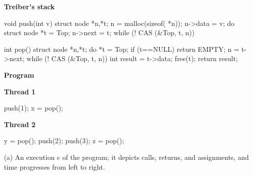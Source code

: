 \begin{figure*}[t]
  \lstset{numbers=left, 
          numberstyle=\tiny\tt, 
          stepnumber=1, 
          firstnumber=1,
          numbersep=4pt}
  \footnotesize
    \lstset{numbers=none}
  \begin{minipage}[c]{50mm}
    {\normalsize \textbf{Treiber's stack}}
    \begin{program}
void push(int v) {
  struct node *n,*t;
  n = malloc(sizeof( *n));
  n->data = v;
  do {
    struct node *t = Top;
    n->next = t;
  } while (! CAS (&Top, t, n))
}

int pop() {
  struct node *n,*t;
  do {
    *t = Top;
    if (t==NULL)
      return EMPTY;
    n = t->next;
  } while (! CAS (&Top, t, n))
  int result = t->data;
  free(t);
  return result;
}
    \end{program}
    {\normalsize\bf Program} \\[1mm]
    \begin{minipage}[b]{17mm}
      \textbf{Thread 1}
      \begin{program}
push(1);
x = pop();
      \end{program}
      \vspace{6.3mm}
    \end{minipage}
    \begin{minipage}[b]{16mm}
      \textbf{Thread 2}
      \begin{program}
y = pop();
push(2);
push(3);
z = pop();
      \end{program}
    \end{minipage}
  \end{minipage}
  \begin{minipage}[c]{130mm}

    
    
    \centering
    \medskip
    (a) An execution $e$ of the program; it depicts calls,
  returns, and assignments, and time progresses from left to right.
    
    \bigskip
    \begin{minipage}[c]{7cm}
    


\end{minipage}
\end{minipage}
\end{figure*}
